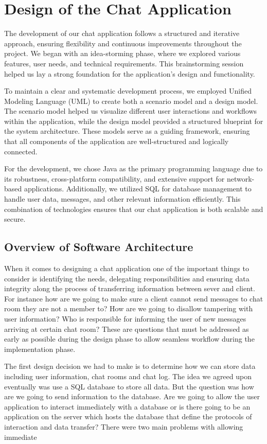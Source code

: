 \section{Design of the Chat Application}
The development of our chat application follows a structured and iterative
approach, ensuring flexibility and continuous improvements throughout the
project. We began with an idea-storming phase, where we explored various
features, user needs, and technical requirements. This brainstorming session
helped us lay a strong foundation for the application's design and
functionality.

To maintain a clear and systematic development process, we employed Unified
Modeling Language (UML) to create both a scenario model and a design model. The
scenario model helped us visualize different user interactions and workflows
within the application, while the design model provided a structured blueprint
for the system architecture. These models serve as a guiding framework,
ensuring that all components of the application are well-structured and
logically connected.

For the development, we chose Java as the primary programming language due to
its robustness, cross-platform compatibility, and extensive support for
network-based applications. Additionally, we utilized SQL for database
management to handle user data, messages, and other relevant information
efficiently. This combination of technologies ensures that our chat application
is both scalable and secure.

\subsection{Overview of Software Architecture}
When it comes to designing a chat application one of the important things to
consider is identifying the needs, delegating responsibilities and ensuring data
integrity along the process of transferring information between sever and
client. For instance how are we going to make sure a client cannot send
messages to chat room they are not a member to? How are we going to disallow
tampering with user information? Who is responsible for informing the user of
new messages arriving at certain chat room? These are questions that must be
addressed as early as possible during the design phase to allow seamless
workflow during the implementation phase. 

The first design decision we had to make is to determine how we can store data
including user information, chat rooms and chat log. The idea we agreed upon 
eventually was use a SQL database to store all data. But the question was how are
we going to send information to the database. Are we going to allow the user application
to interact immediately with a database or is there going to be an application on 
the server which hosts the database that define the protocols of interaction and 
data transfer? There were two main problems with allowing immediate

